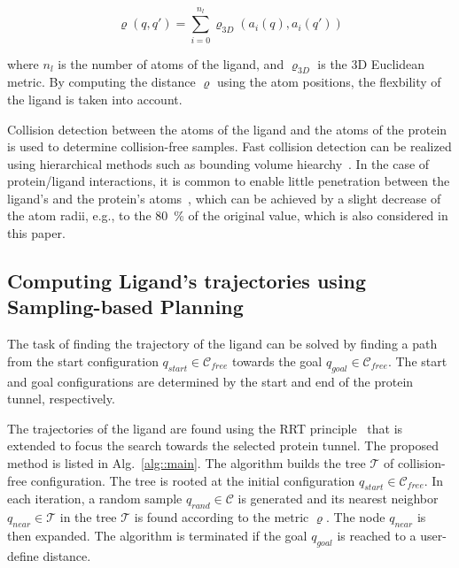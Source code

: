 \documentclass{bmcart}
\def\qrand{q_{rand}}
\def\qstart{q_{start}}
\def\qgoal{q_{goal}}
\def\qnear{q_{near}}
\def\T{\mathcal{T}}
\def\C{\mathcal{C}}
\def\CF{\mathcal{C}_{free}}
\def\dist{\varrho}
\def\distt{\varrho_{3D}}
\begin{document}
\begin{equation}
\label{eq::distance}
\dist(q,q') = \sum_{i=0}^{n_l} \distt( a_i(q),a_i(q') )
\end{equation}

\noindent
where $n_l$ is the number of atoms of the ligand, and $\distt$ is the 3D Euclidean metric.
By computing the distance $\dist$ using the atom positions, the flexbility of the ligand is taken into account.

Collision detection between the atoms of the ligand and the atoms of the protein is used to determine collision-free samples.
Fast collision detection can be realized using hierarchical methods such as bounding volume hiearchy~\cite{ericson2004real}.
In the case of protein/ligand interactions, it is common to enable little penetration between the ligand's and 
the protein's atoms~\cite{cortes2010simulating}, which can be achieved by a slight decrease
of the atom radii, e.g., to the 80~\% of the original value, which is also considered in this paper.


\subsection*{Computing Ligand's trajectories using Sampling-based Planning}

The task of finding the trajectory of the ligand can be solved by finding a path from the
start configuration $\qstart \in \CF$ towards the goal $\qgoal \in \CF$.
The start and goal configurations are determined by the start and end of the protein tunnel, respectively.

The trajectories of the ligand are found using the RRT principle~\cite{lavalleRRT} that is extended to focus the search towards the selected protein tunnel.
The proposed method is listed in Alg.~\ref{alg::main}.
The algorithm builds the tree $\T$ of collision-free configuration. 
The tree is rooted at the initial configuration $\qstart \in \CF$.
In each iteration, a random sample $\qrand \in \C$ is generated and its nearest neighbor $\qnear \in \T$ 
in the tree $\T$ is found according to the metric $\dist$.
The node $\qnear$ is then expanded.
The algorithm is terminated if the goal $\qgoal$ is reached to a user-define distance.
\end{document}
